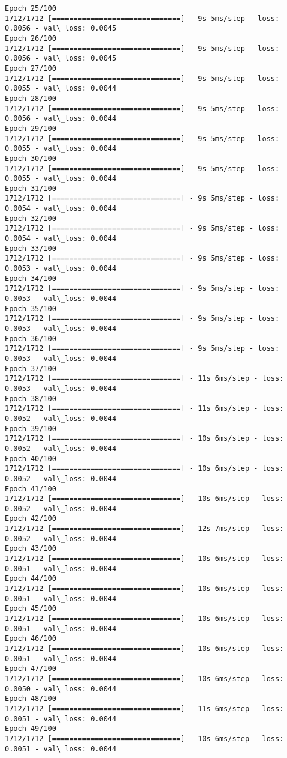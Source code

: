 \documentclass[11pt]{article}
\begin{document}
\begin{Verbatim}[commandchars=\\\{\}]
Epoch 25/100
1712/1712 [==============================] - 9s 5ms/step - loss: 0.0056 - val\_loss: 0.0045
Epoch 26/100
1712/1712 [==============================] - 9s 5ms/step - loss: 0.0056 - val\_loss: 0.0045
Epoch 27/100
1712/1712 [==============================] - 9s 5ms/step - loss: 0.0055 - val\_loss: 0.0044
Epoch 28/100
1712/1712 [==============================] - 9s 5ms/step - loss: 0.0056 - val\_loss: 0.0044
Epoch 29/100
1712/1712 [==============================] - 9s 5ms/step - loss: 0.0055 - val\_loss: 0.0044
Epoch 30/100
1712/1712 [==============================] - 9s 5ms/step - loss: 0.0055 - val\_loss: 0.0044
Epoch 31/100
1712/1712 [==============================] - 9s 5ms/step - loss: 0.0054 - val\_loss: 0.0044
Epoch 32/100
1712/1712 [==============================] - 9s 5ms/step - loss: 0.0054 - val\_loss: 0.0044
Epoch 33/100
1712/1712 [==============================] - 9s 5ms/step - loss: 0.0053 - val\_loss: 0.0044
Epoch 34/100
1712/1712 [==============================] - 9s 5ms/step - loss: 0.0053 - val\_loss: 0.0044
Epoch 35/100
1712/1712 [==============================] - 9s 5ms/step - loss: 0.0053 - val\_loss: 0.0044
Epoch 36/100
1712/1712 [==============================] - 9s 5ms/step - loss: 0.0053 - val\_loss: 0.0044
Epoch 37/100
1712/1712 [==============================] - 11s 6ms/step - loss: 0.0053 - val\_loss: 0.0044
Epoch 38/100
1712/1712 [==============================] - 11s 6ms/step - loss: 0.0052 - val\_loss: 0.0044
Epoch 39/100
1712/1712 [==============================] - 10s 6ms/step - loss: 0.0052 - val\_loss: 0.0044
Epoch 40/100
1712/1712 [==============================] - 10s 6ms/step - loss: 0.0052 - val\_loss: 0.0044
Epoch 41/100
1712/1712 [==============================] - 10s 6ms/step - loss: 0.0052 - val\_loss: 0.0044
Epoch 42/100
1712/1712 [==============================] - 12s 7ms/step - loss: 0.0052 - val\_loss: 0.0044
Epoch 43/100
1712/1712 [==============================] - 10s 6ms/step - loss: 0.0051 - val\_loss: 0.0044
Epoch 44/100
1712/1712 [==============================] - 10s 6ms/step - loss: 0.0051 - val\_loss: 0.0044
Epoch 45/100
1712/1712 [==============================] - 10s 6ms/step - loss: 0.0051 - val\_loss: 0.0044
Epoch 46/100
1712/1712 [==============================] - 10s 6ms/step - loss: 0.0051 - val\_loss: 0.0044
Epoch 47/100
1712/1712 [==============================] - 10s 6ms/step - loss: 0.0050 - val\_loss: 0.0044
Epoch 48/100
1712/1712 [==============================] - 11s 6ms/step - loss: 0.0051 - val\_loss: 0.0044
Epoch 49/100
1712/1712 [==============================] - 10s 6ms/step - loss: 0.0051 - val\_loss: 0.0044

\end{Verbatim}
\end{document}
